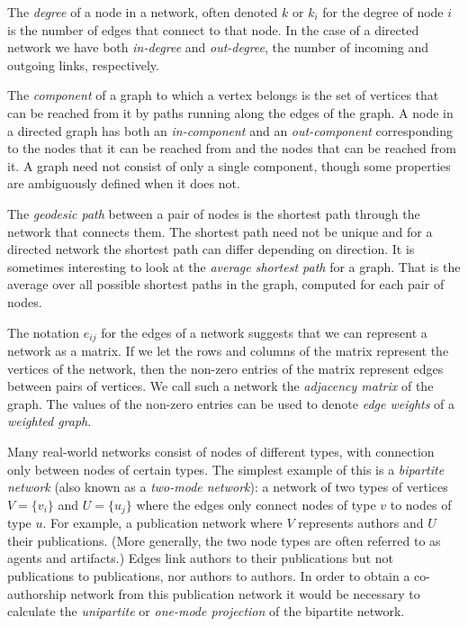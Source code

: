 The \emph{degree} of a node in a network, often denoted $k$ or $k_i$ for the degree of node $i$ is the number of edges that connect to that node. In the case of a directed network we have both \emph{in-degree} and \emph{out-degree}, the number of incoming and outgoing links, respectively.

The \emph{component} of a graph to which a vertex belongs is the set of vertices that can be reached from it by paths running along the edges of the graph. A node in a directed graph has both an \emph{in-component} and an \emph{out-component} corresponding to the nodes that it can be reached from and the nodes that can be reached from it. A graph need not consist of only a single component, though some properties are ambiguously defined when it does not.

The \emph{geodesic path} between a pair of nodes is the shortest path through the network that connects them. The shortest path need not be unique and for a directed network the shortest path can differ depending on direction.
It is sometimes interesting to look at the \emph{average shortest path} for a graph. That is the average over all possible shortest paths in the graph, computed for each pair of nodes. 

The notation $e_{ij}$ for the edges of a network suggests that we can represent a network as a matrix. If we let the rows and columns of the matrix represent the vertices of the network, then the non-zero entries of the matrix represent edges between pairs of vertices. We call such a network the \emph{adjacency matrix} of the graph. The values of the non-zero entries can be used to denote \emph{edge weights} of a \emph{weighted graph}.

Many real-world networks consist of nodes of different types, with connection only between nodes of certain types. The simplest example of this is a \emph{bipartite network} (also known as a \emph{two-mode network}): a network of two types of vertices $V=\{v_i\}$ and $U=\{u_j\}$ where the edges only connect nodes of type $v$ to nodes of type $u$. For example, a publication network where $V$ represents authors and $U$ their publications.  (More generally, the two node types are often referred to as agents and artifacts.) Edges link authors to their publications but not publications to publications, nor authors to authors. In order to obtain a co-authorship network from this publication network it would be necessary to calculate the \emph{unipartite} or \emph{one-mode projection} of the bipartite network.


